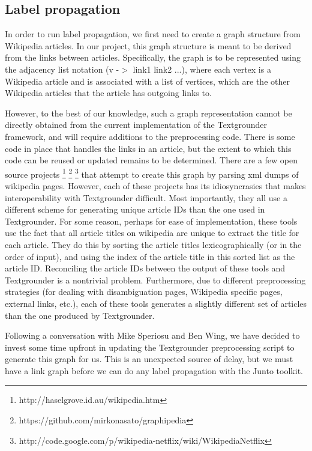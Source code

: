 \subsection{Label propagation}
In order to run label propagation, we first need to create a graph structure from
Wikipedia articles. In our project, this graph structure is meant to be derived from the
links between articles. Specifically, the graph is to be represented using the
adjacency list notation (v -$>$ link1 link2 ...), where each vertex is a Wikipedia
article and is associated with a list of vertices, which are the other Wikipedia articles that the article has outgoing links to.
\par
However, to the best of our knowledge, such a graph representation cannot be
directly obtained from the current implementation of the Textgrounder
framework, and will require additions to the preprocessing code.
There is some code in place that handles the links in an article, but the
extent to which this code can be reused or updated remains to be determined.
There are a few open source projects
\footnote{http://haselgrove.id.au/wikipedia.htm}
\footnote{https://github.com/mirkonasato/graphipedia}
\footnote{http://code.google.com/p/wikipedia-netflix/wiki/WikipediaNetflix}
that attempt to create this graph by parsing xml dumps of wikipedia pages.
However, each of these projects has its idiosyncrasies that makes
interoperability with Textgrounder difficult. 
Most importantly, they all use a different scheme for generating unique article
IDs than the one used in Textgrounder.
For some reason, perhaps for ease of implementation, these tools use the fact
that all article titles on wikipedia are unique to extract the title for each
article.
They do this by sorting the article titles lexicographically (or in the order
of input), and using the index of the article title in this sorted list as the
article ID.
Reconciling the article IDs between the output of these tools and Textgrounder
is a nontrivial problem.
Furthermore, due to different preprocessing strategies (for dealing with
disambiguation pages, Wikipedia specific pages, external links, etc.), each of
these tools generates a slightly different set of articles than the one
produced by Textgrounder.
\par
Following a conversation with Mike Speriosu and Ben Wing, we have decided to
invest some time upfront in updating the Textgrounder preprocessing script to
generate this graph for us.
This is an unexpected source of delay, but we must have a link graph before we
can do any label propagation with the Junto toolkit.
